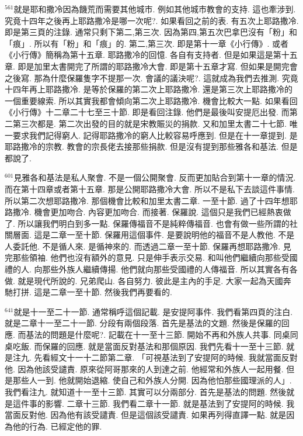 \documentclass{book}
\begin{document}
$^{561}$就是耶和撒冷因為饑荒而需要其他城市.
例如其他城市教會的支持.
這也牽涉到.
究竟十四年之後再上耶路撒冷是哪一次呢?.
如果看回之前的表.
有五次上耶路撒冷.
即是第三頁的注錄.
通常只剩下第二,第三次.
因為第四,第五次巴拿巴沒有「粉」和「痕」.
所以有「粉」和「痕」的.
第二,第三次.
即是第十一章《小行傳》.
或者《小行傳》簡稱為第十五章.
耶路撒冷的回憶.
各自有支持者.
但是如果這是第十五章.
即是加里太書開完了所謂的耶路撒冷大會.
即是第十五章才寫.
但如果是開完會之後寫.
那為什麼保羅隻字不提那一次.
會議的議決呢?.
這就成為我們去推測.
究竟十四年再上耶路撒冷.
是等於保羅的第二次上耶路撒冷.
還是第三次上耶路撒冷的一個重要線索.
所以其實我都會傾向第二次上耶路撒冷.
機會比較大一點.
如果看回《小行傳》十二章二十七至三十節.
即是看回注錄.
他們是最後叫安提厄出發.
而第二第三次都是.
第二次出發的目的就是宋教賑災的捐款.
又和加里太書二十七節.
唯一要求我們記得窮人.
記得耶路撒冷的窮人比較容易呼應到.
但是在十一章提到.
是耶路撒冷的宗教.
教會的宗長佬去接那些捐款.
但是沒有提到那些雅各和基法.
但是都說了.

$^{601}$見雅各和基法是私人聚會.
不是一個公開聚會.
反而更加貼合到第十一章的情況.
而在第十四章或者第十五章.
那是公開耶路撒冷大會.
所以不是私下去談這件事情.
所以第二次想耶路撒冷.
那個機會比較和加里太書二章.
一至十節.
過了十四年想耶路撒冷.
機會更加吻合.
內容更加吻合.
而接著.
保羅說.
這個只是我們已經熱衷做了.
所以讓我們明白到多一點.
保羅傳福音不是純粹傳福音.
也會有做一些所謂的社關層面.
這是二章一至十節.
保羅用這個事件.
是要說明他的福音不是人教他.
不是人委託他.
不是循人來.
是循神來的.
而透過二章一至十節.
保羅再想耶路撒冷.
見完那些領袖.
他們也沒有額外的意見.
只是伸手表示交易.
和叫他們繼續向那些受國禮的人.
向那些外族人繼續傳揚.
他們就向那些受國禮的人傳福音.
所以其實各有各做.
就是現代所說的.
兄弟爬山.
各自努力.
彼此是主內的手足.
大家一起為天國奔馳打拼.
這是二章一至十節.
然後我們再要看的.

$^{641}$就是十一至二十一節.
通常稱呼這個記載.
是安提阿事件.
我們看第四頁的注白.
就是二章十一至二十一節.
分段有兩個段落.
首先是基法的文題.
然後是保羅的回應.
而基法的問題是什麼呢?.
記載在十一至十三節.
開始不再和外族人共事.
同桌同桌吃飯.
而保羅的回應.
就是當面反對基法和那個原因.
我們先看十一至十三節.
就是注九.
先看經文十一十二節第二章.
「可視基法到了安提阿的時候.
我就當面反對他.
因為他該受譴責.
原來從阿哥那來的人到達之前.
他經常和外族人一起用餐.
但是那些人一到.
他就開始退縮.
使自己和外族人分開.
因為他怕那些國理派的人」.
我們看注九.
就知道十一至十三節.
其實可以分兩部分.
首先是基法的問題.
然後就是這件事的影響.
二章十三節.
我們看二章十一節.
就是基法到了安提阿的時候.
我當面反對他.
因為他有該受譴責.
但是這個該受譴責.
如果再列得直譯一點.
就是因為他的行為.
已經定他的罪.
\end{document}
